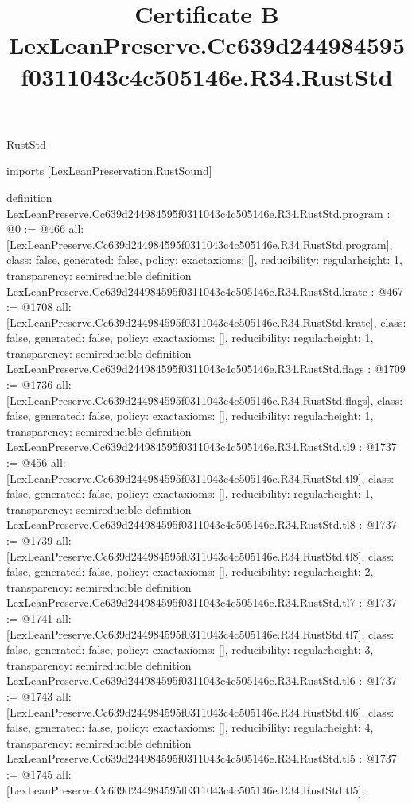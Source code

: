 \begin{lexlean}{RustStd}
\title{Certificate B LexLeanPreserve.Cc639d244984595f0311043c4c505146e.R34.RustStd}
\begin{coremodule}
imports [LexLeanPreservation.RustSound]

definition LexLeanPreserve.Cc639d244984595f0311043c4c505146e.R34.RustStd.program : @0 := @466 {
  all: [LexLeanPreserve.Cc639d244984595f0311043c4c505146e.R34.RustStd.program],
  class: false,
  generated: false,
  policy: exact{axioms: []},
  reducibility: regular{height: 1},
  transparency: semireducible
}
definition LexLeanPreserve.Cc639d244984595f0311043c4c505146e.R34.RustStd.krate : @467 := @1708 {
  all: [LexLeanPreserve.Cc639d244984595f0311043c4c505146e.R34.RustStd.krate],
  class: false,
  generated: false,
  policy: exact{axioms: []},
  reducibility: regular{height: 1},
  transparency: semireducible
}
definition LexLeanPreserve.Cc639d244984595f0311043c4c505146e.R34.RustStd.flags : @1709 := @1736 {
  all: [LexLeanPreserve.Cc639d244984595f0311043c4c505146e.R34.RustStd.flags],
  class: false,
  generated: false,
  policy: exact{axioms: []},
  reducibility: regular{height: 1},
  transparency: semireducible
}
definition LexLeanPreserve.Cc639d244984595f0311043c4c505146e.R34.RustStd.tl9 : @1737 := @456 {
  all: [LexLeanPreserve.Cc639d244984595f0311043c4c505146e.R34.RustStd.tl9],
  class: false,
  generated: false,
  policy: exact{axioms: []},
  reducibility: regular{height: 1},
  transparency: semireducible
}
definition LexLeanPreserve.Cc639d244984595f0311043c4c505146e.R34.RustStd.tl8 : @1737 := @1739 {
  all: [LexLeanPreserve.Cc639d244984595f0311043c4c505146e.R34.RustStd.tl8],
  class: false,
  generated: false,
  policy: exact{axioms: []},
  reducibility: regular{height: 2},
  transparency: semireducible
}
definition LexLeanPreserve.Cc639d244984595f0311043c4c505146e.R34.RustStd.tl7 : @1737 := @1741 {
  all: [LexLeanPreserve.Cc639d244984595f0311043c4c505146e.R34.RustStd.tl7],
  class: false,
  generated: false,
  policy: exact{axioms: []},
  reducibility: regular{height: 3},
  transparency: semireducible
}
definition LexLeanPreserve.Cc639d244984595f0311043c4c505146e.R34.RustStd.tl6 : @1737 := @1743 {
  all: [LexLeanPreserve.Cc639d244984595f0311043c4c505146e.R34.RustStd.tl6],
  class: false,
  generated: false,
  policy: exact{axioms: []},
  reducibility: regular{height: 4},
  transparency: semireducible
}
definition LexLeanPreserve.Cc639d244984595f0311043c4c505146e.R34.RustStd.tl5 : @1737 := @1745 {
  all: [LexLeanPreserve.Cc639d244984595f0311043c4c505146e.R34.RustStd.tl5],
}
\end{coremodule}
\end{lexlean}
